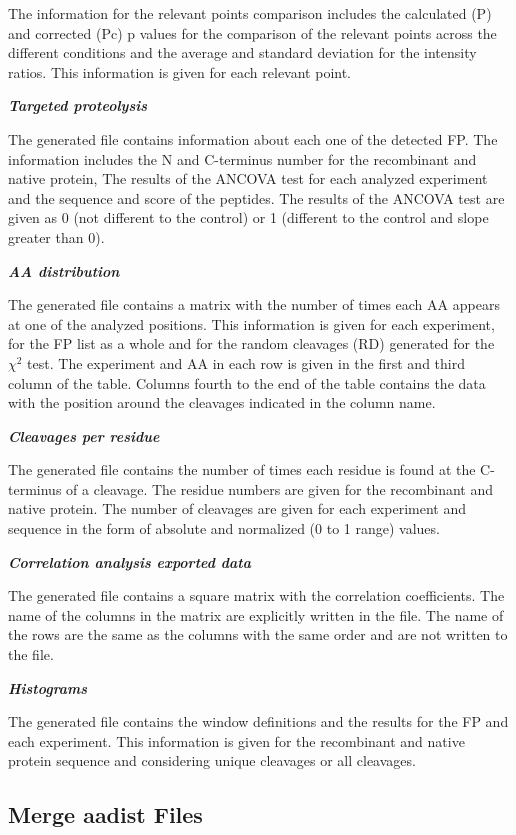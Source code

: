The information for the relevant points comparison includes the calculated (P) and corrected (Pc) p values for the comparison of the relevant points across the different conditions and the average and standard deviation for the intensity ratios. This information is given for each relevant point.

\textit{\textbf{Targeted proteolysis}} 

The generated file contains information about each one of the detected FP. The information includes the N and C-terminus number for the recombinant and native protein, The results of the ANCOVA test for each analyzed experiment and the sequence and score of the peptides. The results of the ANCOVA test are given as 0 (not different to the control) or 1 (different to the control and slope greater than 0).

\textit{\textbf{AA distribution}}

The generated file contains a matrix with the number of times each AA appears at one of the analyzed positions. This information is given for each experiment, for the FP list as a whole and for the random cleavages (RD) generated for the $\chi^2$ test. The experiment and AA in each row is given in the first and third column of the table. Columns fourth to the end of the table contains the data with the position around the cleavages indicated in the column name.

\textit{\textbf{Cleavages per residue}}

The generated file contains the number of times each residue is found at the C-terminus of a cleavage. The residue numbers are given for the recombinant and native protein. The number of cleavages are given for each experiment and sequence in the form of absolute and normalized (0 to 1 range) values.

\textit{\textbf{Correlation analysis exported data}} 

The generated file contains a square matrix with the correlation coefficients. The name of the columns in the matrix are explicitly written in the file. The name of the rows are the same as the columns with the same order and are not written to the file.

\textbf{\textit{Histograms}}

The generated file contains the window definitions and the results for the FP and each experiment. This information is given for the recombinant and native protein sequence and considering unique cleavages or all cleavages.

\subsection{Merge aadist Files}
\label{subsec:utilMergeAadistFiles}


